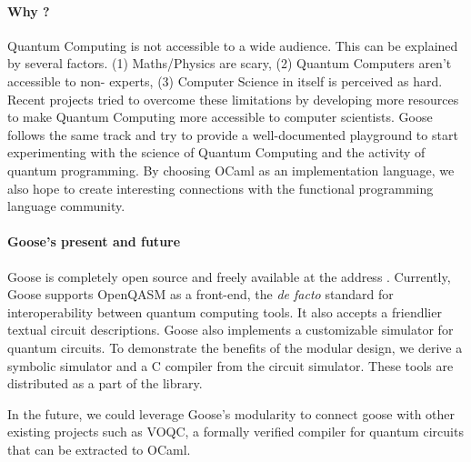 \documentclass[a4paper]{easychair}
\begin{document}
\paragraph*{Why ?} Quantum Computing is not accessible to a wide audience. This can be explained by several factors. (1) Maths/Physics are scary, (2) Quantum Computers aren't accessible to non- experts, (3) Computer Science in itself is perceived as hard.
Recent projects \cite{} tried to overcome these limitations by developing more resources to make Quantum Computing more accessible to computer scientists. Goose follows the same track and try to provide a well-documented playground to start experimenting with the science of Quantum Computing and the activity of quantum programming. By choosing OCaml as an implementation language, we also hope to create interesting connections with the functional programming language community.

\paragraph*{Goose's present and future} Goose is completely open source and freely available at the address \url{}.
Currently, Goose supports OpenQASM as a front-end, the \textit{de facto} standard for interoperability between quantum computing tools. It also accepts a friendlier textual circuit descriptions. Goose also implements a customizable simulator for quantum circuits. To demonstrate the benefits of the modular design, we derive a symbolic simulator and a C compiler from the circuit simulator. These tools are distributed as a part of the library.

In the future, we could leverage Goose's modularity to connect goose with other existing projects such as VOQC, a formally verified compiler for quantum circuits that can be extracted to OCaml.





\end{document}

